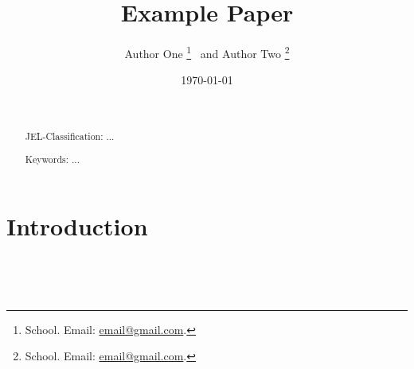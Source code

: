 \documentclass[12pt]{article}
\title{Example Paper}
\author{
    Author One%
    \thanks{School. Email: \href{mailto:email@gmail.com}{email@gmail.com}.} \ and Author Two%
    \thanks{School. Email: \href{mailto:email@gmail.com}{email@gmail.com}.}
}
\date{\today}
\begin{document}
\maketitle
\begin{abstract}


  \par~\par\noindent
  {\color{asher}JEL-Classification:} ...
  \par\noindent
  {\color{asher}Keywords:} ...
  \par\vspace{-2.5mm}
\end{abstract}

\newpage



\section{Introduction}





\newpage~


\newpage~\appendix
{}
\renewcommand{\thefigure}{\Alph{section}\arabic{figure}}
\renewcommand{\thetable}{\Alph{section}\arabic{table}}
\end{document}
